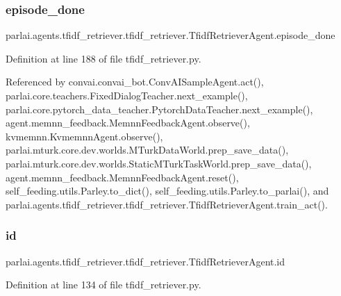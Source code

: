 \subsubsection{\texorpdfstring{episode\+\_\+done}{episode\_done}}
{\footnotesize\ttfamily parlai.\+agents.\+tfidf\+\_\+retriever.\+tfidf\+\_\+retriever.\+Tfidf\+Retriever\+Agent.\+episode\+\_\+done}



Definition at line 188 of file tfidf\+\_\+retriever.\+py.



Referenced by convai.\+convai\+\_\+bot.\+Conv\+A\+I\+Sample\+Agent.\+act(), parlai.\+core.\+teachers.\+Fixed\+Dialog\+Teacher.\+next\+\_\+example(), parlai.\+core.\+pytorch\+\_\+data\+\_\+teacher.\+Pytorch\+Data\+Teacher.\+next\+\_\+example(), agent.\+memnn\+\_\+feedback.\+Memnn\+Feedback\+Agent.\+observe(), kvmemnn.\+Kvmemnn\+Agent.\+observe(), parlai.\+mturk.\+core.\+dev.\+worlds.\+M\+Turk\+Data\+World.\+prep\+\_\+save\+\_\+data(), parlai.\+mturk.\+core.\+dev.\+worlds.\+Static\+M\+Turk\+Task\+World.\+prep\+\_\+save\+\_\+data(), agent.\+memnn\+\_\+feedback.\+Memnn\+Feedback\+Agent.\+reset(), self\+\_\+feeding.\+utils.\+Parley.\+to\+\_\+dict(), self\+\_\+feeding.\+utils.\+Parley.\+to\+\_\+parlai(), and parlai.\+agents.\+tfidf\+\_\+retriever.\+tfidf\+\_\+retriever.\+Tfidf\+Retriever\+Agent.\+train\+\_\+act().

\mbox{\label{classparlai_1_1agents_1_1tfidf__retriever_1_1tfidf__retriever_1_1TfidfRetrieverAgent_aed60a70d24ee40222693ee15f3bb7400}} 
\subsubsection{\texorpdfstring{id}{id}}
{\footnotesize\ttfamily parlai.\+agents.\+tfidf\+\_\+retriever.\+tfidf\+\_\+retriever.\+Tfidf\+Retriever\+Agent.\+id}



Definition at line 134 of file tfidf\+\_\+retriever.\+py.



